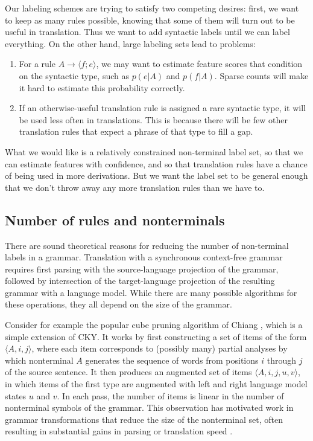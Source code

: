 \documentclass{article}
\begin{document}
Our labeling schemes are trying to satisfy two competing desires: first, we want to keep as many rules possible, knowing that some of them will turn out to be useful in translation. Thus we want to add syntactic labels until we can label everything. On the other hand, large labeling sets lead to problems:
\begin{enumerate}
\item For a rule $A \to \langle f ; e \rangle$, we may want to estimate feature scores that condition on the syntactic type, such as $p(e|A)$ and $p(f|A)$. Sparse counts will make it hard to estimate this probability correctly.
\item If an otherwise-useful translation rule is assigned a rare syntactic type, it will be used less often in translations. This is because there will be few other translation rules that expect a phrase of that type to fill a gap.
\end{enumerate}
What we would like is a relatively constrained non-terminal label set, so that we can estimate features with confidence, and so that translation rules have a chance of being used in more derivations. But we want the label set to be general enough that we don't throw away any more translation rules than we have to.


\subsection{Number of rules and nonterminals}

There are sound theoretical reasons for reducing the number of non-terminal labels in a grammar. Translation with a synchronous context-free grammar requires first parsing with the source-language projection of the grammar, followed by intersection of the target-language projection of the resulting grammar with a language model. While there are many possible algorithms for these operations, they all depend on the size of the grammar.

Consider for example the popular cube pruning algorithm of Chiang
, which is a simple extension of CKY. It works by first
constructing a set of items of the form $\langle A, i, j \rangle$,
where each item corresponds to (possibly many) partial analyses by
which nonterminal $A$ generates the sequence of words from positions
$i$ through $j$ of the source sentence. It then produces an augmented
set of items $\langle A, i, j, u, v \rangle$, in which items of the
first type are augmented with left and right language model states $u$
and $v$. In each pass, the number of items is linear in the number of
nonterminal symbols of the grammar. This observation has motivated
work in grammar transformations that reduce the size of the
nonterminal set, often resulting in substantial gains in parsing or
translation speed \cite{song2008,denero-efficient-parsing,xiao2009}.
\end{document}
